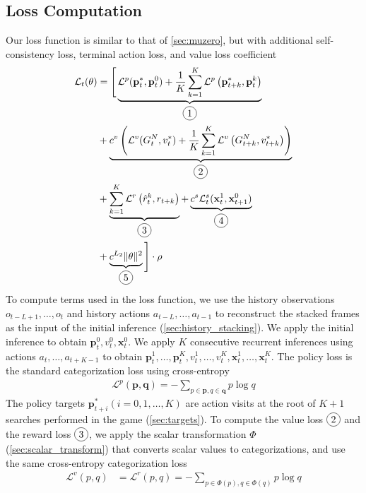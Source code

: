 \subsection{Loss Computation} \label{sec:loss}
Our loss function is similar to that of \ref{sec:muzero}, but with additional self-consistency loss, terminal action loss, and value loss coefficient
\begin{align*}
    \mathcal{L}_{t}(\theta)
      & =
    \Bigg[
    \underbrace{\mathcal{L}^p(\mathbf{p}^*_t, \mathbf{p}^0_t) + \frac{1}{K}\sum_{k=1}^{K} \mathcal{L}^{p}\left(\mathbf{p}^*_{t+k}, \mathbf{p}_{t}^{k}\right)}_{\circled{1}}  \\
      & +
    \underbrace{c^v\left(\mathcal{L}^v(G^N_{t}, v^*_t) + \frac{1}{K}\sum_{k=1}^{K} \mathcal{L}^{v}\left(G^N_{t+k}, v^*_{t+k}\right) \right)}_{\circled{2}}  \\
      & +
    \underbrace{\sum_{k=1}^{K} \mathcal{L}^{r}\left(\hat{r}_t^k, r_{t+k}\right)}_{\circled{3}}
    +
    \underbrace{c^{s}\mathcal{L}^s_t(\mathbf{x}^1_t, \mathbf{x}^0_{t+1})}_{\circled{4}}  \\
      & +
    \underbrace{c^{L_2}\|\theta\|^{2}}_{\circled{5}}
    \Bigg] \cdot \rho
    \\
\end{align*}
To compute terms used in the loss function, we use the history observations \(o_{t-L+1}, \dots, o_t\) and history actions \(a_{t-L}, \dots, a_{t -1}\) to reconstruct the stacked frames as the input of the initial inference (\ref{sec:history_stacking}).
We apply the initial inference to obtain $\mathbf{p}^0_t, v^0_t, \mathbf{x}^0_t$.
We apply $K$ consecutive recurrent inferences using actions \(a_t, \dots, a_{t+K - 1}\) to obtain \(\mathbf{p}^1_t, \dots, \mathbf{p}^K_t, v^1_t, \dots, v^K_t, \mathbf{x}^1_t, \dots, \mathbf{x}^K_t\).
The policy loss  is the standard categorization loss using cross-entropy
\begin{align*}
    \mathcal{L}^p(\mathbf{p}, \mathbf{q}) = - \sum_{p \in \mathbf{p}, q \in \mathbf{q}} p \log{q}
\end{align*}
The policy targets $\mathbf{p}^*_{t+i} (i = 0, 1, \dots, K)$ are action visits at the root of $K+1$ searches performed in the game (\ref{sec:targets}).
To compute the value loss $\circled{2}$ and the reward loss $\circled{3}$, we apply the scalar transformation $\Phi$ (\ref{sec:scalar_transform}) that converts scalar values to categorizations,
and use the same cross-entropy categorization loss
\begin{align*}
    \mathcal{L}^v(p, q)  & = \mathcal{L}^r(p, q) = - \sum_{p \in \Phi(p), q \in \Phi(q)} p \log{q}  \\
\end{align*}

